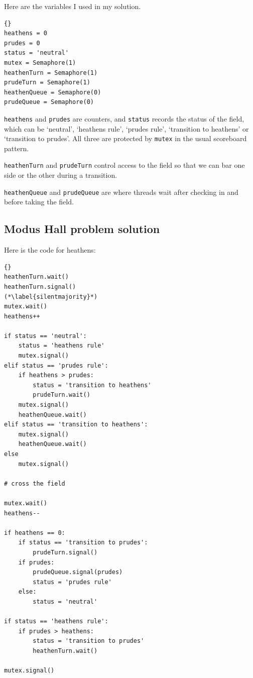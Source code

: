 \documentclass{book}
\newcommand{\clearemptydoublepage}{\newpage\cleardoublepage}
\begin{document}
Here are the variables I used in my solution.

\begin{lstlisting}[caption={Modus problem hint}]{}
heathens = 0
prudes = 0
status = 'neutral'
mutex = Semaphore(1)
heathenTurn = Semaphore(1)
prudeTurn = Semaphore(1)
heathenQueue = Semaphore(0)
prudeQueue = Semaphore(0)
\end{lstlisting}

{\tt heathens} and {\tt prudes} are counters, and {\tt status} records
the status of the field, which can be `neutral', `heathens rule',
`prudes rule', `transition to heathens' or `transition to prudes'.
All three are protected by {\tt mutex} in the usual scoreboard
pattern.

{\tt heathenTurn} and {\tt prudeTurn} control access to the field
so that we can bar one side or the other during a transition.

{\tt heathenQueue} and {\tt prudeQueue} are where threads wait after
checking in and before taking the field.


\clearemptydoublepage
\subsection {Modus Hall problem solution}

Here is the code for heathens:

\begin{lstlisting}[caption={Modus problem solution}]{}
heathenTurn.wait()
heathenTurn.signal()
(*\label{silentmajority}*)
mutex.wait()
heathens++

if status == 'neutral':
    status = 'heathens rule'
    mutex.signal()
elif status == 'prudes rule':
    if heathens > prudes:
        status = 'transition to heathens'
        prudeTurn.wait()
    mutex.signal()
    heathenQueue.wait()
elif status == 'transition to heathens':
    mutex.signal()
    heathenQueue.wait()
else
    mutex.signal()

# cross the field

mutex.wait()
heathens--

if heathens == 0:
    if status == 'transition to prudes':
        prudeTurn.signal()
    if prudes:
        prudeQueue.signal(prudes)
        status = 'prudes rule'
    else:
        status = 'neutral'
        
if status == 'heathens rule':
    if prudes > heathens:
        status = 'transition to prudes'
        heathenTurn.wait()

mutex.signal()
\end{lstlisting}
\end{document}
